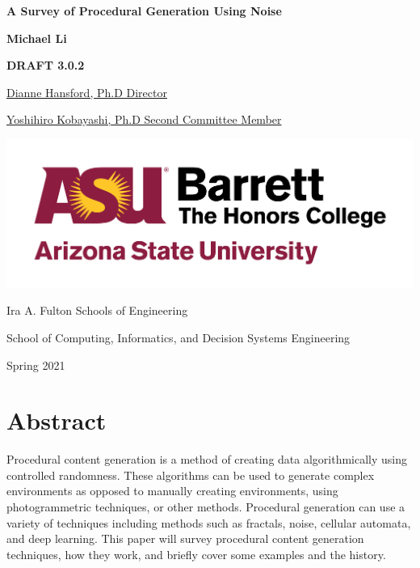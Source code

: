 \documentclass[10pt]{report}
\begin{document}
	\begin{titlepage}
		\begin{center}
			\Large
			\textbf{A Survey of Procedural Generation Using Noise}
			
			\vspace{1.5cm}
			\normalsize
			\textbf{Michael Li}
			
			\vfill
			
			\textbf{DRAFT 3.0.2}
			
			\uline{Dianne Hansford, Ph.D \hfill Director}
			\vspace{1cm}
			
			\uline{Yoshihiro Kobayashi, Ph.D \hfill Second Committee Member}
			
			\vspace{3cm}
			
			\includegraphics[scale=.5]{asu_barretthonors_horiz_rgb_maroongold_600ppi}
			
			\vspace{1.5cm}
			Ira A. Fulton Schools of Engineering
			
			School of Computing, Informatics, and Decision Systems Engineering
			
			Spring 2021
			
		\end{center}
	\end{titlepage}
	
	\chapter*{Abstract}
	
	Procedural content generation is a method of creating data algorithmically using controlled randomness. These algorithms can be used to generate complex environments as opposed to manually creating environments, using photogrammetric techniques, or other methods. Procedural generation can use a variety of techniques including methods such as fractals, noise, cellular automata, and deep learning. This paper will survey procedural content generation techniques, how they work, and briefly cover some examples and the history.
	
\end{document}
